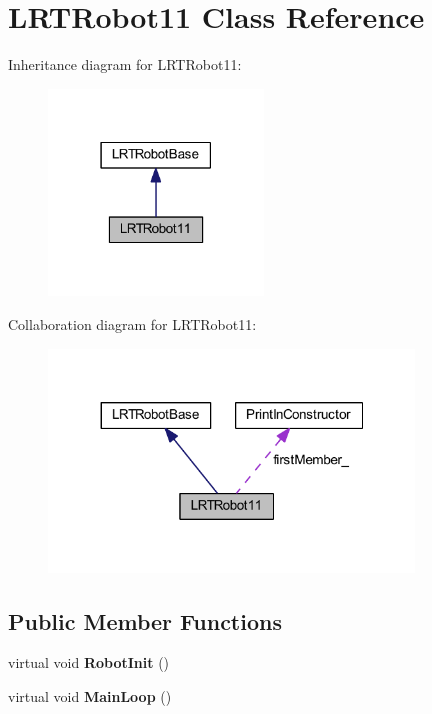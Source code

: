 \hypertarget{class_l_r_t_robot11}{
\section{\-L\-R\-T\-Robot11 \-Class \-Reference}
\label{class_l_r_t_robot11}
}


\-Inheritance diagram for \-L\-R\-T\-Robot11\-:\nopagebreak
\begin{figure}[H]
\begin{center}
\leavevmode
\includegraphics[width=162pt]{class_l_r_t_robot11__inherit__graph}
\end{center}
\end{figure}


\-Collaboration diagram for \-L\-R\-T\-Robot11\-:\nopagebreak
\begin{figure}[H]
\begin{center}
\leavevmode
\includegraphics[width=275pt]{class_l_r_t_robot11__coll__graph}
\end{center}
\end{figure}
\subsection*{\-Public \-Member \-Functions}
\begin{DoxyCompactItemize}
\item 
\hypertarget{class_l_r_t_robot11_a3adcbe755ce60639e87df49295dbfca0}{
virtual void {\bfseries \-Robot\-Init} ()}
\label{class_l_r_t_robot11_a3adcbe755ce60639e87df49295dbfca0}

\item 
\hypertarget{class_l_r_t_robot11_ab4492b590447387126ef91f13d9445eb}{
virtual void {\bfseries \-Main\-Loop} ()}
\label{class_l_r_t_robot11_ab4492b590447387126ef91f13d9445eb}

\end{DoxyCompactItemize}
